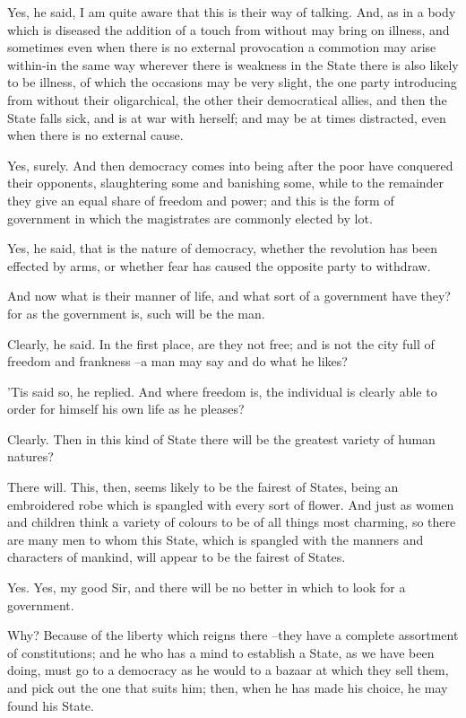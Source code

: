 Yes, he said, I am quite aware that this is their way of talking.
And, as in a body which is diseased the addition of a touch from without may bring on illness, and sometimes even when there is no external provocation a commotion may arise within-in the same way wherever there is weakness in the State there is also likely to be illness, of which the occasions may be very slight, the one party introducing from without their oligarchical, the other their democratical allies, and then the State falls sick, and is at war with herself; and may be at times distracted, even when there is no external cause.

Yes, surely.
And then democracy comes into being after the poor have conquered their opponents, slaughtering some and banishing some, while to the remainder they give an equal share of freedom and power; and this is the form of government in which the magistrates are commonly elected by lot.

Yes, he said, that is the nature of democracy, whether the revolution has been effected by arms, or whether fear has caused the opposite party to withdraw.

And now what is their manner of life, and what sort of a government have they? for as the government is, such will be the man.

Clearly, he said.
In the first place, are they not free; and is not the city full of freedom and frankness --a man may say and do what he likes?

'Tis said so, he replied.
And where freedom is, the individual is clearly able to order for himself his own life as he pleases?

Clearly.
Then in this kind of State there will be the greatest variety of human natures?

There will.
This, then, seems likely to be the fairest of States, being an embroidered robe which is spangled with every sort of flower. And just as women and children think a variety of colours to be of all things most charming, so there are many men to whom this State, which is spangled with the manners and characters of mankind, will appear to be the fairest of States.

Yes.
Yes, my good Sir, and there will be no better in which to look for a government.

Why?
Because of the liberty which reigns there --they have a complete assortment of constitutions; and he who has a mind to establish a State, as we have been doing, must go to a democracy as he would to a bazaar at which they sell them, and pick out the one that suits him; then, when he has made his choice, he may found his State.

